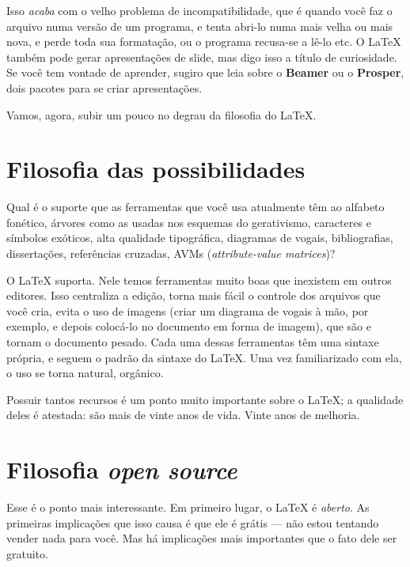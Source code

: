 Isso \emph{acaba} com o velho problema de incompatibilidade, que é quando você faz o arquivo numa versão de um programa, e tenta abri-lo numa mais velha ou mais nova, e perde toda sua formatação, ou o programa recusa-se a lê-lo etc. O \LaTeX{} também pode gerar apresentações de slide, mas digo isso a título de curiosidade. Se você tem vontade de aprender, sugiro que leia sobre o \textbf{Beamer} ou o \textbf{Prosper}, dois pacotes para se criar apresentações.

Vamos, agora, subir um pouco no degrau da filosofia do \LaTeX{}.

\section{Filosofia das possibilidades}

Qual é o suporte que as ferramentas que você usa atualmente têm ao alfabeto fonético, árvores como as usadas nos esquemas do gerativismo, caracteres e símbolos exóticos, alta qualidade tipográfica, diagramas de vogais, bibliografias, dissertações, referências cruzadas, AVMs (\emph{attribute-value matrices})?

O \LaTeX{} suporta. Nele temos ferramentas muito boas que inexistem em outros editores. Isso centraliza a edição, torna mais fácil o controle dos arquivos que você cria, evita o uso de imagens (criar um diagrama de vogais à mão, por exemplo, e depois colocá-lo no documento em forma de imagem), que são e tornam o documento pesado. Cada uma dessas ferramentas têm uma sintaxe própria, e seguem o padrão da sintaxe do \LaTeX. Uma vez familiarizado com ela, o uso se torna natural, orgânico.

Possuir tantos recursos é um ponto muito importante sobre o \LaTeX; a qualidade deles é atestada: são mais de vinte anos de vida. Vinte anos de melhoria.

\section{Filosofia \emph{open source}}

Esse é o ponto mais interessante. Em primeiro lugar, o \LaTeX{} é \emph{aberto}. As primeiras implicações que isso causa é que ele é grátis --- não estou tentando vender nada para você. Mas há implicações mais importantes que o fato dele ser gratuito.

